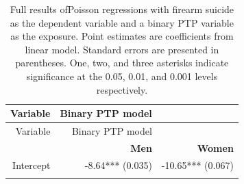 \documentclass[]{article}
\begin{document}
\begin{longtable}[c]{@{}rrr@{}}
\caption{Full results ofPoisson regressions with firearm suicide as the
dependent variable and a binary PTP variable as the exposure. Point
estimates are coefficients from linear model. Standard errors are
presented in parentheses. One, two, and three asterisks indicate
significance at the 0.05, 0.01, and 0.001 levels
respectively.}\tabularnewline
\toprule
\begin{minipage}[b]{0.24\columnwidth}\raggedleft\strut
Variable
\strut\end{minipage} &
\begin{minipage}[b]{0.24\columnwidth}\raggedleft\strut
Binary PTP model
\strut\end{minipage} &
\begin{minipage}[b]{0.24\columnwidth}\raggedleft\strut
~
\strut\end{minipage}\tabularnewline
\midrule
\endfirsthead
\toprule
\begin{minipage}[b]{0.24\columnwidth}\raggedleft\strut
Variable
\strut\end{minipage} &
\begin{minipage}[b]{0.24\columnwidth}\raggedleft\strut
Binary PTP model
\strut\end{minipage} &
\begin{minipage}[b]{0.24\columnwidth}\raggedleft\strut
~
\strut\end{minipage}\tabularnewline
\midrule
\endhead
\begin{minipage}[t]{0.24\columnwidth}\raggedleft\strut
\strut\end{minipage} &
\begin{minipage}[t]{0.24\columnwidth}\raggedleft\strut
\textbf{Men}
\strut\end{minipage} &
\begin{minipage}[t]{0.24\columnwidth}\raggedleft\strut
\textbf{Women}
\strut\end{minipage}\tabularnewline
\begin{minipage}[t]{0.24\columnwidth}\raggedleft\strut
Intercept
\strut\end{minipage} &
\begin{minipage}[t]{0.24\columnwidth}\raggedleft\strut
-8.64*** (0.035)
\strut\end{minipage} &
\begin{minipage}[t]{0.24\columnwidth}\raggedleft\strut
-10.65*** (0.067)
\strut\end{minipage}\tabularnewline
\begin{minipage}[t]{0.24\columnwidth}\raggedleft\strut

\end{minipage}
\end{longtable}
\end{document}
